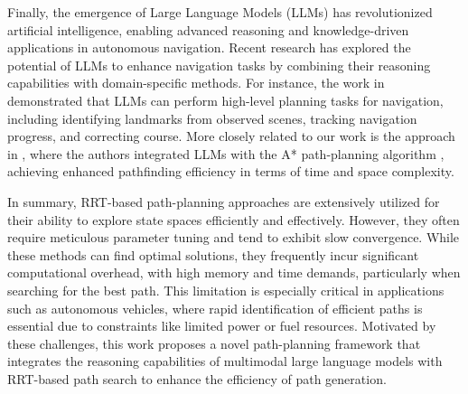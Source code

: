 Finally, the emergence of Large Language Models (LLMs) \cite{touvron2023llama, brown2020language} has revolutionized artificial intelligence, enabling advanced reasoning and knowledge-driven applications in autonomous navigation. Recent research has explored the potential of LLMs to enhance navigation tasks by combining their reasoning capabilities with domain-specific methods. For instance, the work in \cite{zhou2024navgpt} demonstrated that LLMs can perform high-level planning tasks for navigation, including identifying landmarks from observed scenes, tracking navigation progress, and correcting course. More closely related to our work is the approach in \cite{meng2024llm}, where the authors integrated LLMs with the A* path-planning algorithm \cite{Hart1968}, achieving enhanced pathfinding efficiency in terms of time and space complexity.

In summary, RRT-based path-planning approaches are extensively utilized for their ability to explore state spaces efficiently and effectively. However, they often require meticulous parameter tuning and tend to exhibit slow convergence. While these methods can find optimal solutions, they frequently incur significant computational overhead, with high memory and time demands, particularly when searching for the best path. This limitation is especially critical in applications such as autonomous vehicles, where rapid identification of efficient paths is essential due to constraints like limited power or fuel resources. Motivated by these challenges, this work proposes a novel path-planning framework that integrates the reasoning capabilities of multimodal large language models with RRT-based path search to enhance the efficiency of path generation.


